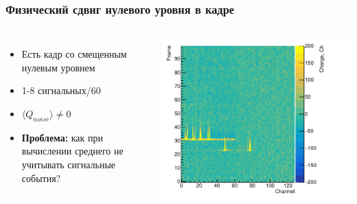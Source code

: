 \documentclass[14pt]{beamer}
\begin{document}
\begin{frame}[t]
\frametitle{Физический сдвиг нулевого уровня в кадре}
\vspace{0pt}
\begin{columns}
	\begin{minipage}[t][1\textheight]{\linewidth}
		\small{\begin{itemize}
				\item Есть кадр со смещенным нулевым уровнем
				\item 1-8 сигнальных/60
				\item $\langle Q_{noise}\rangle \neq 0 $
				\item \textbf{Проблема:} как при вычислении среднего не учитывать сигнальные события?
		\end{itemize}}
	\end{minipage}%
	\begin{minipage}[t][1\textheight]{\linewidth}
		\hspace*{5pt}
		\centering\includegraphics[width=1.05\linewidth]{median_monitor.pdf}
	
		
	\end{minipage}%
\end{columns}
\end{frame}
\end{document}
